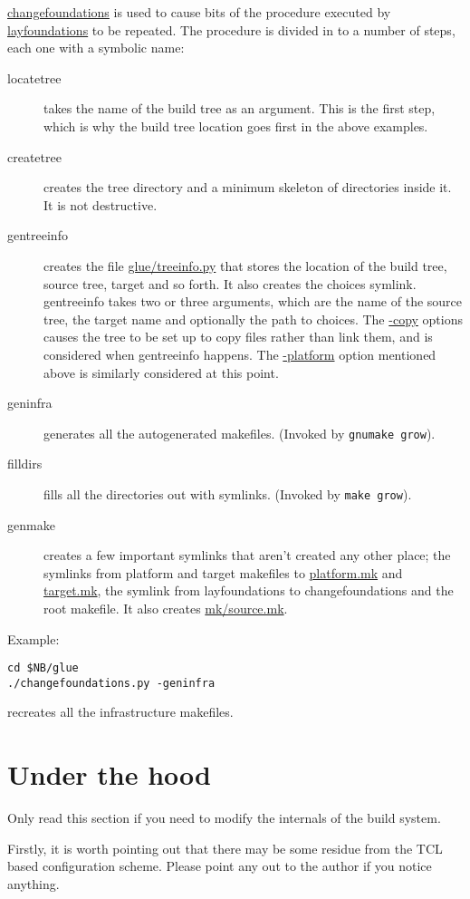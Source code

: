 \documentclass[a4paper]{article}
\newcommand{\cmd}[1]{\texttt{#1}}
\begin{document}
\url{changefoundations} is used to cause bits of the procedure
executed by \url{layfoundations} to be repeated. The procedure is
divided in to a number of steps, each one with a symbolic name:

\begin{description}
\item[locatetree] takes the name of the
build tree as an argument. This is the first step, which is why the
build tree location goes first in the above examples.
\item[createtree] creates the tree directory and a minimum skeleton of
directories inside it. It is not destructive.
\item[gentreeinfo] creates the file \url{glue/treeinfo.py} that stores
the location of the build tree, source tree, target and so forth. It
also creates the choices symlink. gentreeinfo takes two or three
arguments, which are the name of the source tree, the target name and
optionally the path to
choices. The \url{-copy} options causes the tree to be set up to copy
files rather than link them, and is considered when gentreeinfo
happens. The \url{-platform} option mentioned above is similarly
considered at this point.
\item[geninfra] generates all the autogenerated makefiles. (Invoked by
\cmd{gnumake grow}).
\item[filldirs] fills all the directories out with symlinks. (Invoked
by \cmd{make grow}).
\item[genmake] creates a few important symlinks that aren't created any
other place; the symlinks from platform and target makefiles to
\url{platform.mk} and \url{target.mk}, the symlink from layfoundations
to changefoundations and the root makefile. It also creates
\url{mk/source.mk}.
\end{description}

Example:

\begin{verbatim}
cd $NB/glue
./changefoundations.py -geninfra
\end{verbatim}%

recreates all the infrastructure makefiles. 

\section{Under the hood}

Only read this section if you need to modify the internals of the
build system.

Firstly, it is worth pointing out that there may be some residue from
the TCL based configuration scheme. Please point any out to the author
if you notice anything. 
\end{document}
